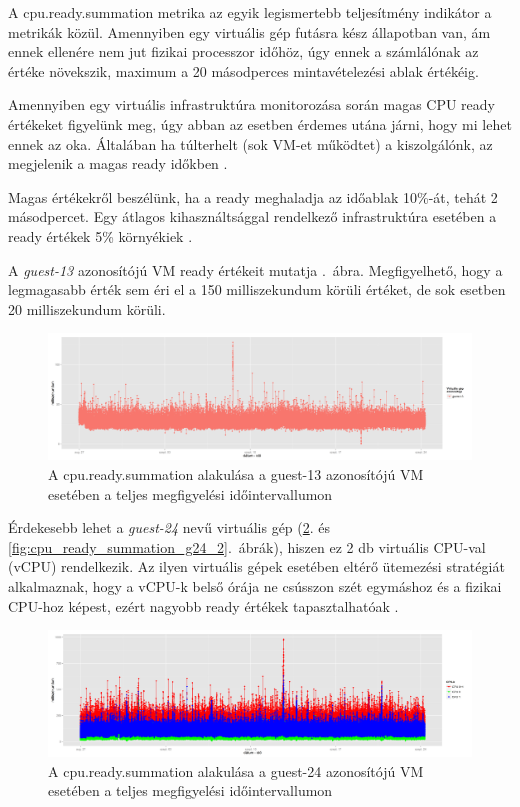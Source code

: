 \documentclass[a4paper,10pt,titlepage]{article}
\begin{document}
A cpu.ready.summation metrika az egyik legismertebb teljesítmény indikátor a metrikák közül. Amennyiben egy virtuális gép futásra kész állapotban van, ám ennek ellenére nem jut fizikai processzor időhöz, úgy ennek a számlálónak az értéke növekszik, maximum a 20 másodperces mintavételezési ablak értékéig.

Amennyiben egy virtuális infrastruktúra monitorozása során magas CPU ready értékeket figyelünk meg, úgy abban az esetben érdemes utána járni, hogy mi lehet ennek az oka. Általában ha túlterhelt (sok VM-et működtet) a kiszolgálónk, az megjelenik a magas ready időkben \cite{link:VPM}.

Magas értékekről beszélünk, ha a ready meghaladja az időablak 10\%-át, tehát 2 másodpercet. Egy átlagos kihasználtsággal rendelkező infrastruktúra esetében a ready értékek 5\% környékiek \cite{link:CRT}.

A \textit{guest-13} azonosítójú VM ready értékeit mutatja .~ábra. Megfigyelhető, hogy a legmagasabb érték sem éri el a 150 milliszekundum körüli értéket, de sok esetben 20 milliszekundum körüli.

\begin{figure}[h!]
\centering
\includegraphics[width=1.00\textwidth]{figures/cpu_ready_summation-guest-13-20120826230140-20120924083120.png}
\caption{A cpu.ready.summation alakulása a guest-13 azonosítójú VM esetében a teljes megfigyelési időintervallumon \label{fig:cpu_ready_summation_g13}}
\end{figure}

Érdekesebb lehet a \textit{guest-24} nevű virtuális gép (\ref{fig:cpu_ready_summation_g24_1}. és \ref{fig:cpu_ready_summation_g24_2}.~ábrák), hiszen ez 2 db virtuális CPU-val (vCPU) rendelkezik. Az ilyen virtuális gépek esetében eltérő ütemezési stratégiát alkalmaznak, hogy a vCPU-k belső órája ne csússzon szét egymáshoz és a fizikai CPU-hoz képest, ezért nagyobb ready értékek tapasztalhatóak \cite{link:VMCS}.

\begin{figure}[h!]
\centering
\includegraphics[width=1.00\textwidth]{figures/cpu_ready_summation-guest-24-20120826230140-20120924083120.png}
\caption{A cpu.ready.summation alakulása a guest-24 azonosítójú VM esetében a teljes megfigyelési időintervallumon \label{fig:cpu_ready_summation_g24_1}}
\end{figure}
\end{document}
